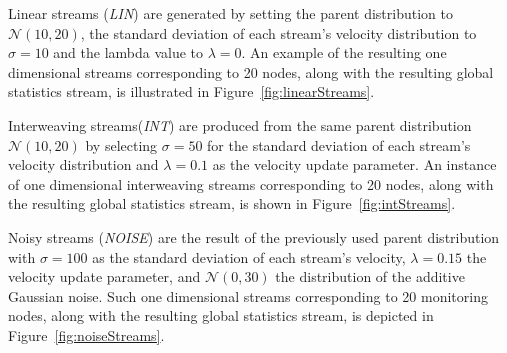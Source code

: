 Linear streams (\emph{LIN}) are generated by setting the parent distribution to $\mathcal{N}(10,20)$, the standard deviation of each stream's velocity distribution to $\sigma=10$ and the lambda value to $\lambda=0$. An example of the resulting one dimensional streams corresponding to 20 nodes, along with the resulting global statistics stream, is illustrated in Figure~\ref{fig:linearStreams}.

Interweaving streams(\emph{INT}) are produced from the same parent distribution $\mathcal{N}(10,20)$ by selecting $\sigma=50$ for the standard deviation of each stream's velocity distribution and $\lambda=0.1$ as the velocity update parameter. An instance of one dimensional interweaving streams corresponding to 20 nodes, along with the resulting global statistics stream, is shown in Figure~\ref{fig:intStreams}.

Noisy streams (\emph{NOISE}) are the result of the previously used parent distribution with $\sigma=100$ as the standard deviation of each stream's velocity, $\lambda=0.15$ the velocity update parameter, and  $\mathcal{N}(0,30)$ the distribution of the additive Gaussian noise. Such one dimensional streams corresponding to 20 monitoring nodes, along with the resulting global statistics stream, is depicted in Figure~\ref{fig:noiseStreams}.

